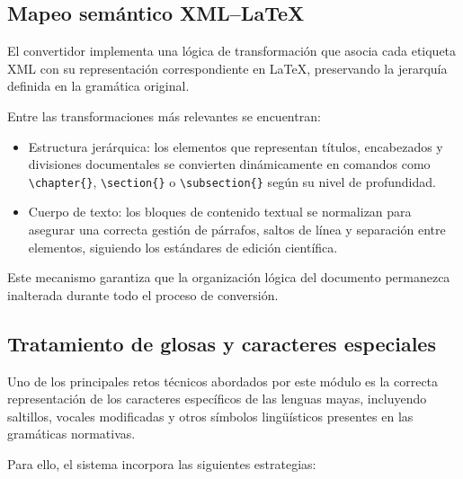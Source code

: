 \subsection{Mapeo semántico XML--\LaTeX}

El convertidor implementa una lógica de transformación que asocia cada etiqueta XML con su representación correspondiente en \LaTeX, preservando la jerarquía definida en la gramática original.

Entre las transformaciones más relevantes se encuentran:

\begin{itemize}
    \item Estructura jerárquica: los elementos que representan títulos, encabezados y divisiones documentales se convierten dinámicamente en comandos como \verb|\chapter{}|, \verb|\section{}| o \verb|\subsection{}| según su nivel de profundidad.

    \item Cuerpo de texto: los bloques de contenido textual se normalizan para asegurar una correcta gestión de párrafos, saltos de línea y separación entre elementos, siguiendo los estándares de edición científica.
\end{itemize}

Este mecanismo garantiza que la organización lógica del documento permanezca inalterada durante todo el proceso de conversión.

\subsection{Tratamiento de glosas y caracteres especiales}

Uno de los principales retos técnicos abordados por este módulo es la correcta representación de los caracteres específicos de las lenguas mayas, incluyendo saltillos, vocales modificadas y otros símbolos lingüísticos presentes en las gramáticas normativas.

Para ello, el sistema incorpora las siguientes estrategias:

